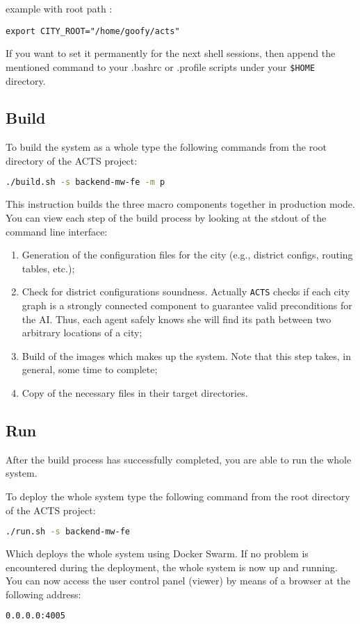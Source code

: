 example with root path :
\begin{lstlisting}
export CITY_ROOT="/home/goofy/acts"
\end{lstlisting}

If you want to set it permanently for the next shell sessions,
then append the mentioned command
to your .bashrc or .profile scripts under your
\texttt{\$HOME} directory.

\subsection{Build}\label{sec:sys-build}

To build the system as a whole type the following commands from the root
directory of the ACTS project:

\begin{lstlisting}[language=bash]
./build.sh -s backend-mw-fe -m p
\end{lstlisting}

This instruction builds the three macro components together in production mode.
You can view each step of the build process by looking at the stdout of the
command line interface:

\begin{enumerate}
\item Generation of the configuration files for the city (e.g., district
  configs, routing tables, etc.);
\item Check for district configurations soundness. Actually \texttt{ACTS}
  checks if each city graph is a strongly connected component to guarantee
  valid preconditions for the AI. Thus, each agent safely knows she will
  find its path between two arbitrary locations of a city;
\item Build of the images which makes up the system. Note that this step
  takes, in general, some time to complete;
\item Copy of the necessary files in their target directories.
\end{enumerate}

\subsection{Run}\label{sec:sys-run}

After the build process has successfully completed, you are able to
run the whole system.

To deploy the whole system type the following command from the root directory
of the ACTS project:

\begin{lstlisting}[language=bash]
./run.sh -s backend-mw-fe
\end{lstlisting}

Which deploys the whole system using Docker Swarm.
If no problem is encountered during the deployment, the whole system is now up
and running.
You can now access the user control panel (viewer) by means of a browser at the
following address:

\begin{lstlisting}[language=bash]
0.0.0.0:4005
\end{lstlisting}
